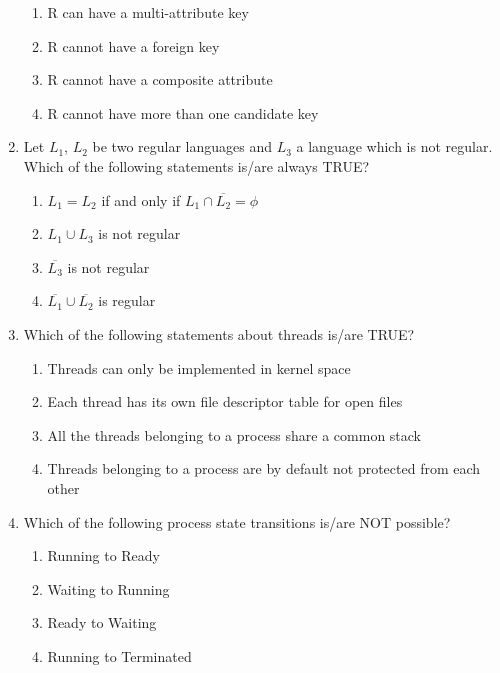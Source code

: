 \documentclass[a4paper, 11pt]{article}
\begin{document}
\begin{enumerate}
    \begin{enumerate}
        \item R can have a multi-attribute key
        \item R cannot have a foreign key
        \item R cannot have a composite attribute
        \item R cannot have more than one candidate key
    \end{enumerate}
    \hfill{}

    \item Let $L_1$, $L_2$ be two regular languages and $L_3$ a language which is not regular. Which of the following statements is/are always TRUE?

    \begin{enumerate}
        \item $L_1 = L_2$ if and only if $L_1 \cap \overline{L_2} = \phi$
        \item $L_1 \cup L_3$ is not regular
        \item $\overline{L_3}$ is not regular
        \item $\overline{L_1} \cup \overline{L_2}$ is regular
    \end{enumerate}
    \hfill{}

    \item Which of the following statements about threads is/are TRUE?

    \begin{enumerate}
        \item Threads can only be implemented in kernel space
        \item Each thread has its own file descriptor table for open files
        \item All the threads belonging to a process share a common stack
        \item Threads belonging to a process are by default not protected from each other
    \end{enumerate}
    \hfill{}

    \item Which of the following process state transitions is/are NOT possible?
    \begin{enumerate}
        \item Running to Ready
        \item Waiting to Running
        \item Ready to Waiting
        \item Running to Terminated
    \end{enumerate}
    \hfill{}


\end{enumerate}
\end{document}
